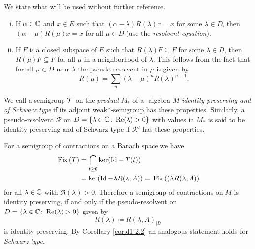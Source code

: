We state what will be used without further reference.
\begin{enumerate}[(i)]
\item 
If $ \alpha \in \mathbb{C} $ and $ x \in E $ such that $ (\alpha - \lambda)R(\lambda)x = x $ for some $ \lambda \in D $, then $ (\alpha - \mu)R(\mu)x = x $ for all $ \mu \in D $ (use the \emph{resolvent equation}).

\item 
If $ F $ is a closed subspace of $ E $ such that $ R(\lambda)F \subseteq F $ for some $ \lambda \in D $, then $ R(\mu)F \subseteq F $ for all $ \mu $ in a neighborhood of $ \lambda $.
This follows from the fact that for all $ \mu \in D $ near $ \lambda $ the pseudo-resolvent in $ \mu $ is given by
\[
R(\mu) = \sum_{n} (\lambda - \mu)^{n} R(\lambda)^{n+1}.
\]
\end{enumerate}
\begin{definition}\label{def:d1-2.5}
We call a semigroup $ \mathcal{T} $ on the \emph{predual} $ M_{*} $ of a \WA-algebra $ M $ \emph{identity preserving and of Schwarz type} if its adjoint weak*-semigroup has these properties.
Similarly, a pseudo-resolvent $ \mathcal{R} $ on $ D = \{\lambda \in \mathbb{C} \colon \mathop{}\!\mathrm{Re}(\lambda) > 0\} $ with values in $ M_{*} $ is said to be identity preserving and of Schwarz type if $ \mathcal{R}' $ has these properties.
\end{definition}
For a semigroup of contractions on a Banach space we have
\begin{align*}
	\mathop{}\mathrm{Fix}\left(T\right) &= \bigcap_{t \geq 0} \ker(\text{Id} - T(t)) \\ 
			& = \ker(\operatorname{Id} - \lambda R(\lambda,A)) = \mathop{}\mathrm{Fix}\left( (\lambda R(\lambda,A) \right)
\end{align*}
for all $ \lambda \in \mathbb{C} $ with $ \Re(\lambda) > 0 $.
Therefore a semigroup of contractions on $ M $ is identity preserving, if and only if the pseudo-resolvent on 
$ D = \{\lambda \in \mathbb{C} \colon \mathop{}\!\mathrm{Re}(\lambda) > 0\} $ given by
\[
	R(\lambda) \coloneqq R(\lambda,A)_{\vert D}
\]
is identity preserving.
By Corollary \ref{cor:d1-2.2} an analogous statement holds for \emph{Schwarz type}.
